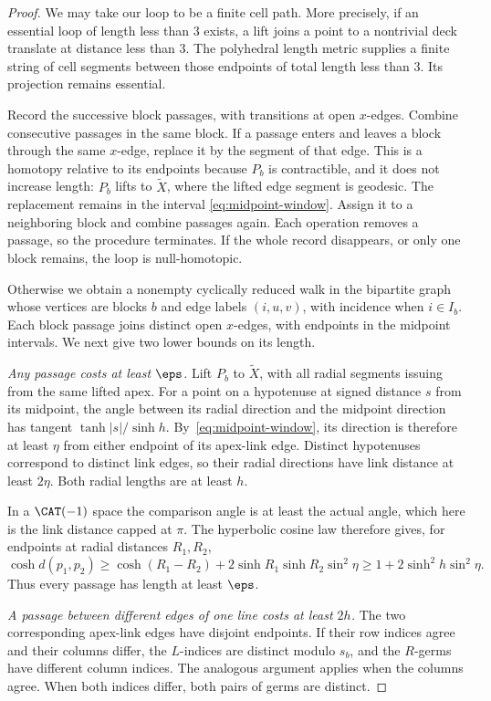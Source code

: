 \begin{proof}
We may take our loop to be a finite cell path. More precisely, if an
essential loop of length less than \(3\) exists, a lift joins a point
to a nontrivial deck translate at distance less than \(3\). The
polyhedral length metric supplies a finite string of cell segments
between those endpoints of total length less than \(3\). Its
projection remains essential.

Record the successive block passages, with transitions at open
\(x\)-edges. Combine consecutive passages in the same block. If a
passage enters and leaves a block through the same \(x\)-edge,
replace it by the segment of that edge. This is a homotopy relative
to its endpoints because \(P_b\) is contractible, and it does not
increase length: \(P_b\) lifts to \(\widetilde X\), where the lifted
edge segment is geodesic. The replacement remains in the interval
\eqref{eq:midpoint-window}. Assign it to a neighboring block and
combine passages again. Each operation removes a passage, so the
procedure terminates. If the whole record disappears, or only one
block remains, the loop is null-homotopic.

Otherwise we obtain a nonempty cyclically reduced walk in the
bipartite graph whose vertices are blocks \(b\) and edge labels
\((i,u,v)\), with incidence when \(i\in I_b\).
Each block passage joins distinct open \(x\)-edges, with endpoints
in the midpoint intervals. We next give two lower bounds on its length.

\smallskip\noindent
\emph{Any passage costs at least \(\eps\).}
Lift \(P_b\) to \(\widetilde X\), with all radial segments issuing
from the same lifted apex. For a point on a hypotenuse at signed
distance \(s\) from its midpoint, the angle between its radial
direction and the midpoint direction has tangent
\(\tanh|s|/\sinh h\). By~\eqref{eq:midpoint-window}, its direction
is therefore at least \(\eta\) from either endpoint of its apex-link
edge. Distinct hypotenuses correspond to distinct link edges, so
their radial directions have link distance at least \(2\eta\).
Both radial lengths are at least \(h\).

In a \(\CAT(-1)\) space the comparison angle is at least the actual
angle, which here is the link distance capped at \(\pi\).
The hyperbolic cosine law therefore gives, for endpoints at radial
distances \(R_1,R_2\),
\[
 \cosh d(p_1,p_2)
 \ge \cosh(R_1-R_2)+2\sinh R_1\sinh R_2\sin^2\eta
 \ge 1+2\sinh^2h\sin^2\eta.
\]
Thus every passage has length at least \(\eps\).

\smallskip\noindent
\emph{A passage between different edges of one line costs at least
\(2h\).}
The two corresponding apex-link edges have disjoint endpoints.
If their row indices agree and their columns differ, the \(L\)-indices
are distinct modulo \(s_b\), and the \(R\)-germs have different
column indices. The analogous argument applies when the columns
agree. When both indices differ, both pairs of germs are distinct.


\end{proof}
